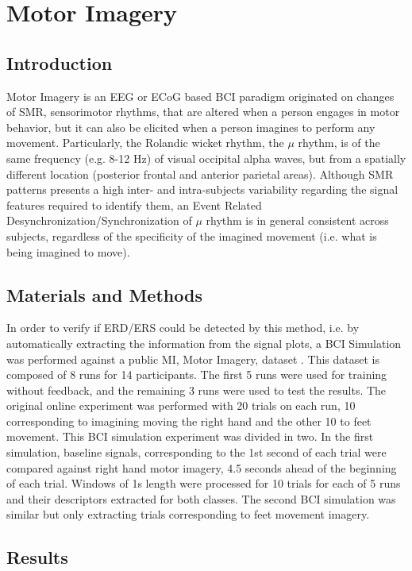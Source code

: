 \chapter{Motor Imagery}
\label{chapter:five}
\section{Introduction}

Motor Imagery is an EEG or ECoG based BCI paradigm originated on changes of SMR, sensorimotor rhythms, that are altered when a person engages in motor behavior, but it can also be elicited when a person imagines to perform any movement. Particularly, the Rolandic wicket rhythm, the $\mu$ rhythm, is of the same frequency (e.g. 8-12 Hz) of visual occipital alpha waves, but from a spatially different location (posterior frontal and anterior parietal areas)\cite{WolpawJonathanR2012}.   Although SMR patterns presents a high inter- and intra-subjects variability regarding the signal features required to identify them, an Event Related Desynchronization/Synchronization of $\mu$ rhythm is in general consistent across subjects, regardless of the specificity of the imagined movement (i.e. what is being imagined to move).

\section{Materials and Methods}

In order to verify if ERD/ERS could be detected by this method, i.e. by automatically extracting the information from the signal plots, a BCI Simulation was performed against a public MI, Motor Imagery, dataset \cite{Steyrl2015}.  This dataset is composed of 8 runs for 14 participants.  The first 5 runs were used for training without feedback, and the remaining 3 runs were used to test the results.  The original online experiment was performed with 20 trials on each run, 10 corresponding to imagining moving the right hand and the other 10 to feet movement.  This BCI simulation experiment was divided in two.  In the first simulation, baseline signals, corresponding to the 1st second of each trial were compared against right hand motor imagery, 4.5 seconds ahead of the beginning of each trial. Windows of 1s length were processed for 10 trials for each of 5 runs and their descriptors extracted for both classes.  The second BCI simulation was similar but only extracting trials corresponding to feet movement imagery.

\section{Results}

